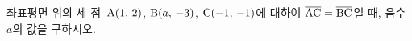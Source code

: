 좌표평면 위의 세 점~$\mathrm{A}(1,\,2)$, $\mathrm{B}(a,\,-3)$, $\mathrm{C}(-1,\,-1)$에 대하여 $\overline{\mathrm{AC}}=\overline{\mathrm{BC}}$일 때, 음수 $a$의 값을 구하시오.
